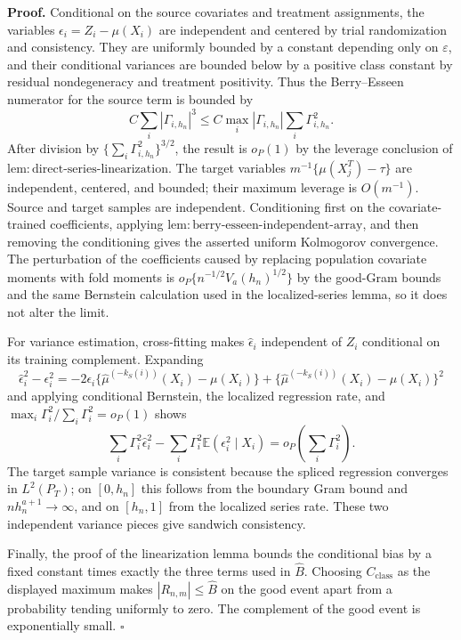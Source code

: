 \textbf{Proof.}
Conditional on the source covariates and treatment assignments, the variables \(\epsilon_i=Z_i-\mu(X_i)\) are independent and centered by trial randomization and consistency.  They are uniformly bounded by a constant depending only on \(\varepsilon\), and their conditional variances are bounded below by a positive class constant by residual nondegeneracy and treatment positivity.  Thus the Berry--Esseen numerator for the source term is bounded by
\[
C\sum_i|\Gamma_{i,h_n}|^3
\le C\max_i|\Gamma_{i,h_n}|\sum_i\Gamma_{i,h_n}^2.
\]
After division by \(\{\sum_i\Gamma_{i,h_n}^2\}^{3/2}\), the result is \(o_P(1)\) by the leverage conclusion of \(\mathrm{lem:direct\text{-}series\text{-}linearization}\).  The target variables \(m^{-1}\{\mu(X_j^T)-\tau\}\) are independent, centered, and bounded; their maximum leverage is \(O(m^{-1})\).  Source and target samples are independent.  Conditioning first on the covariate-trained coefficients, applying \(\mathrm{lem:berry\text{-}esseen\text{-}independent\text{-}array}\), and then removing the conditioning gives the asserted uniform Kolmogorov convergence.  The perturbation of the coefficients caused by replacing population covariate moments with fold moments is \(o_P\{n^{-1/2}V_a(h_n)^{1/2}\}\) by the good-Gram bounds and the same Bernstein calculation used in the localized-series lemma, so it does not alter the limit.

For variance estimation, cross-fitting makes \(\widehat\epsilon_i\) independent of \(Z_i\) conditional on its training complement.  Expanding
\[
\widehat\epsilon_i^2-\epsilon_i^2
=-2\epsilon_i\{\widehat\mu^{(-k_S(i))}(X_i)-\mu(X_i)\}
+\{\widehat\mu^{(-k_S(i))}(X_i)-\mu(X_i)\}^2
\]
and applying conditional Bernstein, the localized regression rate, and \(\max_i\Gamma_i^2/\sum_i\Gamma_i^2=o_P(1)\) shows
\[
\sum_i\Gamma_i^2\widehat\epsilon_i^2
-\sum_i\Gamma_i^2\mathbb E(\epsilon_i^2\mid X_i)=o_P\left(\sum_i\Gamma_i^2\right).
\]
The target sample variance is consistent because the spliced regression converges in \(L^2(P_T)\); on \([0,h_n]\) this follows from the boundary Gram bound and \(nh_n^{a+1}\to\infty\), and on \([h_n,1]\) from the localized series rate.  These two independent variance pieces give sandwich consistency.

Finally, the proof of the linearization lemma bounds the conditional bias by a fixed constant times exactly the three terms used in \(\widehat B\).  Choosing \(C_{\mathrm{class}}\) as the displayed maximum makes \(|R_{n,m}|\le\widehat B\) on the good event apart from a probability tending uniformly to zero.  The complement of the good event is exponentially small. \(\square\)